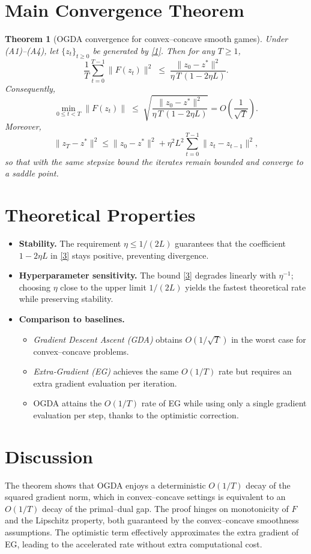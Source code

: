 \documentclass{article}
\newtheorem{theorem}{Theorem}
\begin{document}
\section*{Main Convergence Theorem}
\begin{theorem}[OGDA convergence for convex–concave smooth games]\label{thm:ogda}
Under (A1)–(A4), let $\{z_t\}_{t\ge0}$ be generated by \eqref{1}. Then for any $T\ge1$,
\[
\frac{1}{T}\sum_{t=0}^{T-1}\|F(z_t)\|^{2}
\;\le\;
\frac{\|z_0-z^*\|^{2}}{\eta\,T\,(1-2\eta L)}.
\tag{3}
\]
Consequently,
\[
\min_{0\le t<T}\|F(z_t)\|\;\le\; \sqrt{\frac{\|z_0-z^*\|^{2}}{\eta\,T\,(1-2\eta L)}}=O\!\left(\frac{1}{\sqrt{T}}\right).
\]
Moreover,
\[
\|z_T-z^*\|^{2}\le\|z_0-z^*\|^{2}+ \eta^{2}L^{2}\sum_{t=0}^{T-1}\|z_t-z_{t-1}\|^{2},
\]
so that with the same stepsize bound the iterates remain bounded and converge to a saddle point.
\end{theorem}

\section*{Theoretical Properties}
\begin{itemize}
\item \textbf{Stability.} The requirement $\eta\le 1/(2L)$ guarantees that the coefficient $1-2\eta L$ in \eqref{3} stays positive, preventing divergence.
\item \textbf{Hyperparameter sensitivity.} The bound \eqref{3} degrades linearly with $\eta^{-1}$; choosing $\eta$ close to the upper limit $1/(2L)$ yields the fastest theoretical rate while preserving stability.
\item \textbf{Comparison to baselines.}
    \begin{itemize}
        \item \emph{Gradient Descent Ascent (GDA)} obtains $O(1/\sqrt{T})$ in the worst case for convex–concave problems.
        \item \emph{Extra‑Gradient (EG)} achieves the same $O(1/T)$ rate but requires an extra gradient evaluation per iteration.
        \item OGDA attains the $O(1/T)$ rate of EG while using only a single gradient evaluation per step, thanks to the optimistic correction.
    \end{itemize}
\end{itemize}

\section*{Discussion}
The theorem shows that OGDA enjoys a deterministic $O(1/T)$ decay of the squared gradient norm, which in convex–concave settings is equivalent to an $O(1/T)$ decay of the primal–dual gap. The proof hinges on monotonicity of $F$ and the Lipschitz property, both guaranteed by the convex–concave smoothness assumptions. The optimistic term effectively approximates the extra gradient of EG, leading to the accelerated rate without extra computational cost.
\end{document}
